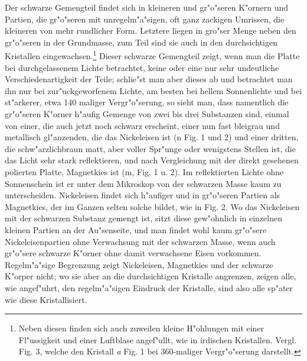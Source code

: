 \documentclass[a4paper, 11pt, oneside, german]{article}
\begin{document}
Der schwarze Gemengteil findet sich in kleineren und gr"o"seren K"ornern und Partien, die gr"o"seren mit unregelm"a"sigen, oft ganz zackigen Umrissen, die kleineren von mehr rundlicher Form. Letztere liegen in gro"ser Menge neben den gr"o"seren in der Grundmasse, zum Teil sind sie auch in den durchsichtigen Kristallen eingewachsen.\footnote{Neben diesen finden sich auch zuweilen kleine H"ohlungen mit einer Fl"ussigkeit und einer Luftblase angef"ullt, wie in irdischen Kristallen. Vergl. Fig. 3, welche den Kristall \emph{a} Fig. 1 bei 360-maliger Vergr"o"serung darstellt.} Dieser schwarze Gemengteil zeigt, wenn man die Platte bei durchgelassenem Lichte betrachtet, keine oder eine nur sehr undeutliche Verschiedenartigkeit der Teile; schlie"st man aber dieses ab und betrachtet man ihn nur bei zur"uckgeworfenem Lichte, am besten bei hellem Sonnenlichte und bei st"arkerer, etwa 140 maliger Vergr"o"serung, so sieht man, dass namentlich die gr"o"seren K"orner h"aufig Gemenge von zwei bis drei Substanzen sind, einmal von einer, die auch jetzt noch schwarz erscheint, einer nun fast bleigrau und metallisch gl"anzenden, die das Nickeleisen ist (n Fig. 1 und 2) und einer dritten, die schw"arzlichbraun matt, aber voller Spr"unge oder wenigstens Stellen ist, die das Licht sehr stark reflektieren, und nach Vergleichung mit der direkt gesehenen polierten Platte, Magnetkies ist (m, Fig. 1 u. 2). Im reflektierten Lichte ohne Sonnenschein ist er unter dem Mikroskop von der schwarzen Masse kaum zu unterscheiden. Nickeleisen findet sich h"aufiger und in gr"o"seren Partien als Magnetkies, der im Ganzen selten solche bildet, wie in Fig. 2. Wo das Nickeleisen mit der schwarzen Substanz gemengt ist, sitzt diese gew"ohnlich in einzelnen kleinen Partien an der Au"senseite, und man findet wohl kaum gr"o"sere Nickeleisenpartien ohne Verwachsung mit der schwarzen Masse, wenn auch gr"o"sere schwarze K"orner ohne damit verwachsene Eisen vorkommen. Regelm"a"sige Begrenzung zeigt Nickeleisen, Magnetkies und der schwarze K"orper nicht; wo sie aber an die durchsichtigen Kristalle angrenzen, zeigen alle, wie angef"uhrt, den regelm"a"sigen Eindruck der Kristalle, sind also alle sp"ater wie diese Kristallisiert.
\end{document}
